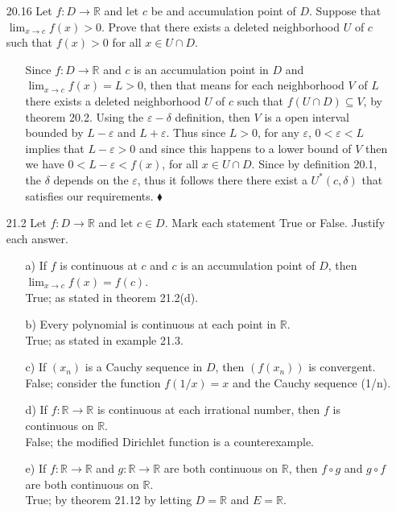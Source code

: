 \documentclass[12pt]{article}
\begin{document}
\begin{enumerate}
\item[20.16] Let $f: D \rightarrow \mathbb{R}$ and let $c$ be and accumulation point of $D$. Suppose that $\lim_{x \rightarrow c}f(x) > 0$. Prove that there exists a deleted neighborhood $U$ of $c$ such that $f(x) > 0$ for all $x \in U \cap D$.
\begin{enumerate}
\item[] Since $f: D \rightarrow \mathbb{R}$ and $c$ is an accumulation point in $D$ and 
$\lim_{x \to c}f(x) = L > 0$, then that means for each neighborhood $V$ of $L$ there exists
a deleted neighborhood $U$ of $c$ such that $f(U \cap D) \subseteq V$, by theorem 20.2.
Using the $\varepsilon - \delta$ definition, then $V$ is a open interval bounded by
$L - \varepsilon$ and $L + \varepsilon$. Thus since $L > 0$, for any $\varepsilon$,
$0 < \varepsilon < L$ implies that $L - \varepsilon > 0$ and since this happens
to a lower bound of $V$ then we have $0 < L - \varepsilon < f(x)$, for all $x \in U \cap D$. 
Since by definition 20.1, the $\delta$ depends on the $\varepsilon$, 
thus it follows there there exist a $U^*(c, \delta)$ that satisfies our requirements.
$\blacklozenge$
\end{enumerate}

\item[21.2] Let $f: D \rightarrow \mathbb{R}$ and let $c \in D$. Mark each statement True or False. Justify each answer.
\begin{enumerate}
\item[a)] If $f$ is continuous at $c$ and $c$ is an accumulation point of $D$, then $\lim_{x \to c}f(x) = f(c)$. \\
True; as stated in theorem 21.2(d).
\item[b)] Every polynomial is continuous at each point in $\mathbb{R}$. \\
True; as stated in example 21.3.
\item[c)] If $(x_n)$ is a Cauchy sequence in $D$, then $(f(x_n))$ is convergent. \\
False; consider the function $f(1/x) = x$ and the Cauchy sequence (1/n).
\item[d)] If $f: \mathbb{R} \rightarrow \mathbb{R}$ is continuous at each irrational number, then $f$ is continuous on $\mathbb{R}$. \\
False; the modified Dirichlet function is a counterexample.
\item[e)] If $f: \mathbb{R} \rightarrow \mathbb{R}$ and $g: \mathbb{R} \rightarrow \mathbb{R}$ are both continuous on $\mathbb{R}$, then $f \circ g$ and $g \circ f$ are both continuous on $\mathbb{R}$. \\
True; by theorem 21.12 by letting $D = \mathbb{R}$ and $E = \mathbb{R}$.
\end{enumerate}


\end{enumerate}
\end{document}
